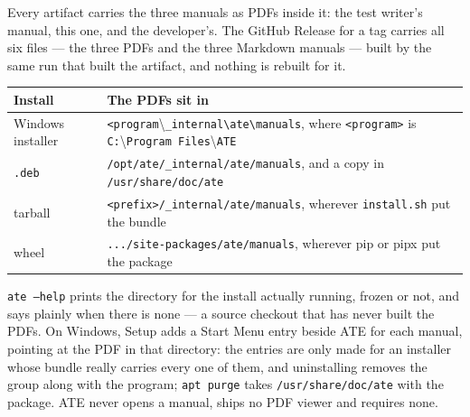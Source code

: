 Every artifact carries the three manuals as PDFs inside it: the test writer's manual, this one, and
the developer's. The GitHub Release for a tag carries all six files --- the three PDFs and the three
Markdown manuals --- built by the same run that built the artifact, and nothing is rebuilt for it.

\begin{center}
\footnotesize
\begin{tabular}{@{}>{\raggedright\arraybackslash}p{3.4cm}>{\raggedright\arraybackslash}p{8.4cm}@{}}
\toprule
Install & The PDFs sit in \\
\midrule
Windows installer & \texttt{<program}\textbackslash\texttt{\_internal}\allowbreak\texttt{\textbackslash ate}\allowbreak\texttt{\textbackslash manuals}, where
  \texttt{<program>} is \texttt{C:}\textbackslash\texttt{Program Files}\textbackslash\texttt{ATE} \\
\texttt{.deb} & \texttt{/opt/ate/}\allowbreak\texttt{\_internal/ate/manuals}, and a copy in
  \texttt{/usr/share/doc/ate} \\
tarball & \texttt{<prefix>/\_internal/ate/manuals}, wherever \texttt{install.sh} put the bundle \\
wheel & \texttt{.../site-packages/ate/manuals}, wherever pip or pipx put the package \\
\bottomrule
\end{tabular}
\end{center}

\texttt{ate --help} prints the directory for the install actually running, frozen or not, and says
plainly when there is none --- a source checkout that has never built the PDFs. On Windows, Setup
adds a Start Menu entry beside ATE for each manual, pointing at the PDF in that directory: the
entries are only made for an installer whose bundle really carries every one of them, and
uninstalling removes the group along with the program; \texttt{apt purge} takes
\texttt{/usr/share/doc/ate} with the package. ATE never opens a manual, ships no PDF viewer
and requires none.

